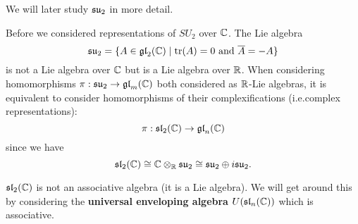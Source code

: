 \begin{rmk}
  We will later study $\mathfrak{su}_2$ in more detail.
  \lv
  \begin{enum}
    \io
    Before we considered representations of $SU_2$ over $\mathbb{C}$.
    The Lie algebra
    \[ \mathfrak{su}_2 = \{ A \in \operatorname{\mathfrak{gl}}_2(\mathbb{C}) \mid \operatorname{tr}(A)=0 \text{ and } \overline A = -A \} \]
    is not a Lie algebra over $\mathbb{C}$ but is a Lie algebra over $\mathbb{R}$.
    When considering homomorphisms $\pi: \mathfrak{su}_2 \to \operatorname{\mathfrak{gl}}_m(\mathbb{C})$ both considered as $\mathbb{R}$-Lie algebras, it is equivalent to consider homomorphisms of their complexifications (i.e.\@ complex representations):
    \[ \pi: \operatorname{\mathfrak{sl}}_2(\mathbb{C}) \to \operatorname{\mathfrak{gl}}_n(\mathbb{C}) \]
    since we have
    \[ \operatorname{\mathfrak{sl}}_2(\mathbb{C}) \cong \mathbb{C} \otimes_{\mathbb{R}} \mathfrak{su}_2 \cong \mathfrak{su}_2 \oplus i \mathfrak{su}_2. \]

    \io
    $\operatorname{\mathfrak{sl}}_2(\mathbb{C})$ is not an associative algebra (it is a Lie algebra).
    We will get around this by considering the \textbf{universal enveloping algebra} $U(\operatorname{\mathfrak{sl}}_n(\mathbb{C}))$ which is associative.
  \end{enum}
\end{rmk}
